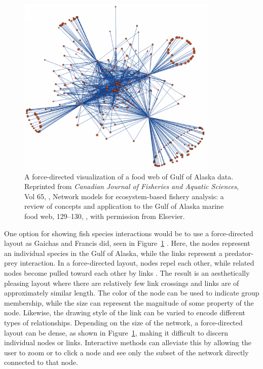 \begin{figure}[h]
	\centering
	\includegraphics[width=0.85\textwidth]{figures/png/gaichas.png}
	\caption[A force-directed visualization of a food web of Gulf of Alaska data]{A force-directed visualization of a food web of Gulf of Alaska data. Reprinted from \textit{Canadian Journal of Fisheries and Aquatic Sciences}, Vol 65, \citeauthor{gaichas2008}, Network models for ecosystem-based fishery analysis: a review of concepts and application to the Gulf of Alaska marine food web, 129--130, \textcopyright \citeyear{gaichas2008}, with permission from Elsevier.}
	\label{fig:gaichas}
\end{figure}


One option for showing fish species interactions would be to use a force-directed layout as Gaichas and Francis did, seen in Figure~\ref{fig:gaichas} \citeyearpar{gaichas2008}.  Here, the nodes represent an individual species in the Gulf of Alaska, while the links represent a predator-prey interaction.  In a force-directed layout, nodes repel each other, while related nodes become pulled toward each other by links \cite{heer2010}.  The result is an aesthetically pleasing layout where there are relatively few link crossings and links are of approximately similar length.  The color of the node can be used to indicate group membership, while the size can represent the magnitude of some property of the node.  Likewise, the drawing style of the link can be varied to encode different types of relationships.  Depending on the size of the network, a force-directed layout can be dense, as shown in Figure~\ref{fig:gaichas}, making it difficult to discern individual nodes or links.  Interactive methods can alleviate this by allowing the user to zoom or to click a node and see only the subset of the network directly connected to that node.

